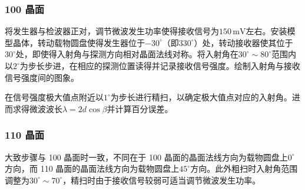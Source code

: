 \documentclass[UTF8]{article}
\theoremstyle{MyLineTheoremStyle} %
\theoremstyle{MyBlockTheoremStyle} %
\theoremstyle{MySubsubsectionStyle} %
\begin{document}
\subsubsection{ 100 晶面}
将发生器与检波器正对，调节微波发生功率使得接收信号为$ 150\,\mathrm{mV} $左右。安装模型晶体，转动载物圆盘使得发生器位于$ -30^\circ $（即$ 330^\circ $）处，转动接收器使其位于$ 30^\circ $处，即使得入射角与探测方向相对晶面法线对称。将入射角在$ 30^\circ\sim80^\circ $范围内以$ 2^\circ $为步长步进，在相应的探测位置读得并记录接收信号强度。绘制入射角与接收信号强度间的图象。

在信号强度极大值点附近以$ 1^\circ $为步长进行精扫，以确定极大值点对应的入射角。进而求得微波波长$ \lambda=2d\cos\beta $并计算百分误差。

\subsubsection{ 110 晶面}
大致步骤与 100 晶面时一致，不同在于 100 晶面的晶面法线方向为载物圆盘上$ 0^\circ $方向，而 110 晶面的晶面法线方向为载物圆盘上$ 45^\circ $方向。此外粗扫时入射角范围调整为$ 30^\circ\sim70^\circ $，精扫时由于接收信号较弱可适当调节微波发生功率。
\end{document}
